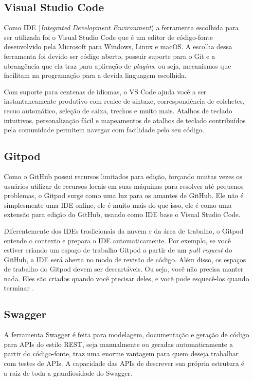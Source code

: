 \subsection{Visual Studio Code}
Como IDE (\textit{Integrated Development Environment}) a ferramenta escolhida para ser utilizada foi o Visual Studio Code que é um editor de código-fonte desenvolvido pela Microsoft para Windows, Linux e macOS. A escolha dessa ferramenta foi devido ser código aberto, possuir suporte para o Git e a abrangência que ela traz para aplicação de \textit{plugins}, ou seja, mecanismos que facilitam na programação para a devida linguagem escolhida.

Com suporte para centenas de idiomas, o VS Code ajuda você a ser instantaneamente produtivo com realce de sintaxe, correspondência de colchetes, recuo automático, seleção de caixa, trechos e muito mais. Atalhos de teclado intuitivos, personalização fácil e mapeamentos de atalhos de teclado contribuídos pela comunidade permitem navegar com facilidade pelo seu código. \cite{mjbvz2020VSCode}


\subsection{Gitpod}
Como o GitHub possui recursos limitados para edição, forçando muitas vezes os usuários utilizar de recursos locais em suas máquinas para resolver até pequenos problemas, o Gitpod surge como uma luz para os amantes de GitHub. Ele não é simplesmente uma IDE online, ele é muito mais do que isso, ele é como uma extensão para edição do GitHub, usando como IDE base o Visual Studio Code. 

Diferentemente dos IDEs tradicionais da nuvem e da área de trabalho, o Gitpod entende o contexto e prepara o IDE automaticamente. Por exemplo, se você estiver criando um espaço de trabalho Gitpod a partir de um \textit{pull request} do GitHub, a IDE será aberta no modo de revisão de código. Além disso, os espaços de trabalho do Gitpod devem ser descartáveis. Ou seja, você não precisa manter nada. Eles são criados quando você precisar deles, e você pode esquecê-los quando terminar \cite{jankeromnes2020Gitpod}. 


\subsection{Swagger}
A ferramenta Swagger é feita para modelagem, documentação e geração de código para APIs do estilo REST, seja manualmente ou geradas automaticamente a partir do código-fonte, traz uma enorme vantagem para quem deseja trabalhar com testes de APIs. A capacidade das APIs de descrever sua própria estrutura é a raiz de toda a grandiosidade do Swagger.

